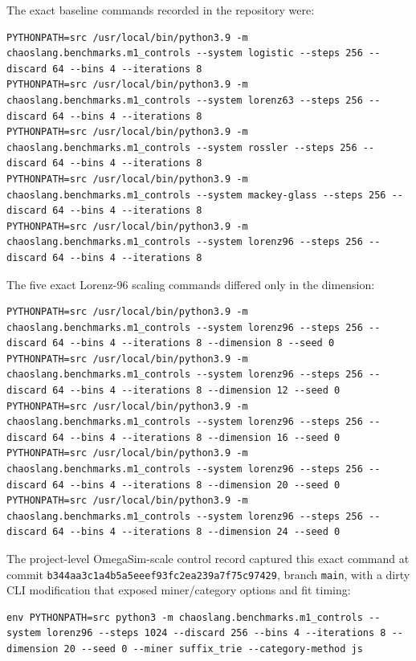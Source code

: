 \documentclass[11pt]{article}
\begin{document}
The exact baseline commands recorded in the repository were:

\begin{lstlisting}
PYTHONPATH=src /usr/local/bin/python3.9 -m chaoslang.benchmarks.m1_controls --system logistic --steps 256 --discard 64 --bins 4 --iterations 8
PYTHONPATH=src /usr/local/bin/python3.9 -m chaoslang.benchmarks.m1_controls --system lorenz63 --steps 256 --discard 64 --bins 4 --iterations 8
PYTHONPATH=src /usr/local/bin/python3.9 -m chaoslang.benchmarks.m1_controls --system rossler --steps 256 --discard 64 --bins 4 --iterations 8
PYTHONPATH=src /usr/local/bin/python3.9 -m chaoslang.benchmarks.m1_controls --system mackey-glass --steps 256 --discard 64 --bins 4 --iterations 8
PYTHONPATH=src /usr/local/bin/python3.9 -m chaoslang.benchmarks.m1_controls --system lorenz96 --steps 256 --discard 64 --bins 4 --iterations 8
\end{lstlisting}

The five exact Lorenz-96 scaling commands differed only in the dimension:

\begin{lstlisting}
PYTHONPATH=src /usr/local/bin/python3.9 -m chaoslang.benchmarks.m1_controls --system lorenz96 --steps 256 --discard 64 --bins 4 --iterations 8 --dimension 8 --seed 0
PYTHONPATH=src /usr/local/bin/python3.9 -m chaoslang.benchmarks.m1_controls --system lorenz96 --steps 256 --discard 64 --bins 4 --iterations 8 --dimension 12 --seed 0
PYTHONPATH=src /usr/local/bin/python3.9 -m chaoslang.benchmarks.m1_controls --system lorenz96 --steps 256 --discard 64 --bins 4 --iterations 8 --dimension 16 --seed 0
PYTHONPATH=src /usr/local/bin/python3.9 -m chaoslang.benchmarks.m1_controls --system lorenz96 --steps 256 --discard 64 --bins 4 --iterations 8 --dimension 20 --seed 0
PYTHONPATH=src /usr/local/bin/python3.9 -m chaoslang.benchmarks.m1_controls --system lorenz96 --steps 256 --discard 64 --bins 4 --iterations 8 --dimension 24 --seed 0
\end{lstlisting}

The project-level OmegaSim-scale control record captured this exact command at
commit \texttt{b344aa3c1a4b5a5eeef93fc2ea239a7f75c97429}, branch
\texttt{main}, with a dirty CLI modification that exposed miner/category
options and fit timing:

\begin{lstlisting}
env PYTHONPATH=src python3 -m chaoslang.benchmarks.m1_controls --system lorenz96 --steps 1024 --discard 256 --bins 4 --iterations 8 --dimension 20 --seed 0 --miner suffix_trie --category-method js
\end{lstlisting}
\end{document}
